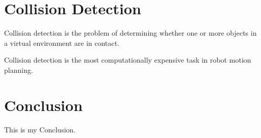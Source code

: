 \documentclass[10pt,conference]{ieeeconf}
\begin{document}
 


\section{Collision Detection}
	
	Collision detection is the problem of determining whether one or more objects in a virtual environment are in contact. 
	
	Collision detection is the most computationally expensive task in robot motion planning. 



\section{Conclusion}
    This is my Conclusion.




\end{document}
